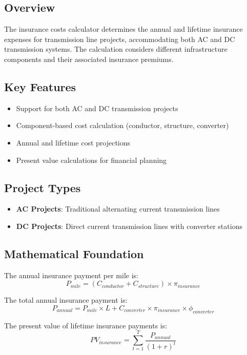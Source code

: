 \documentclass[12pt]{article}
\begin{document}
\subsection{Overview}
The insurance costs calculator determines the annual and lifetime insurance expenses for transmission line projects, accommodating both AC and DC transmission systems. The calculation considers different infrastructure components and their associated insurance premiums.

\subsection{Key Features}
\begin{itemize}
    \item Support for both AC and DC transmission projects
    \item Component-based cost calculation (conductor, structure, converter)
    \item Annual and lifetime cost projections
    \item Present value calculations for financial planning
\end{itemize}

\subsection{Project Types}
\begin{itemize}
    \item \textbf{AC Projects}: Traditional alternating current transmission lines
    \item \textbf{DC Projects}: Direct current transmission lines with converter stations
\end{itemize}

\subsection{Mathematical Foundation}
The annual insurance payment per mile is:
\begin{equation}
P_{mile} = (C_{conductor} + C_{structure}) \times \pi_{insurance}
\end{equation}

The total annual insurance payment is:
\begin{equation}
P_{annual} = P_{mile} \times L + C_{converter} \times \pi_{insurance} \times \phi_{converter}
\end{equation}

The present value of lifetime insurance payments is:
\begin{equation}
PV_{insurance} = \sum_{t=1}^{T} \frac{P_{annual}}{(1 + r)^t}
\end{equation}
\end{document}
